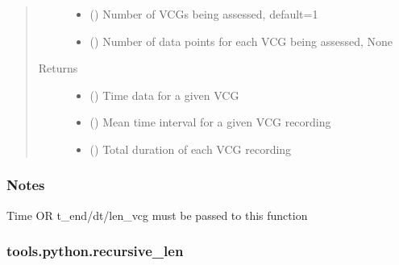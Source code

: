 \documentclass[letterpaper,10pt,english]{sphinxmanual}
\begin{document}
\begin{fulllineitems}
\begin{quote}
\begin{description}
\begin{itemize}
\item {} 
\sphinxAtStartPar
{} (\sphinxstyleliteralemphasis{\sphinxupquote{, }}) \textendash{} Number of VCGs being assessed, default=1

\item {} 
\sphinxAtStartPar
{} (\sphinxstyleliteralemphasis{\sphinxupquote{, }}) \textendash{} Number of data points for each VCG being assessed, None

\end{itemize}

\item[{Returns}] \leavevmode
\sphinxAtStartPar
\begin{itemize}
\item {} 
\sphinxAtStartPar
{} () \textendash{} Time data for a given VCG

\item {} 
\sphinxAtStartPar
{} () \textendash{} Mean time interval for a given VCG recording

\item {} 
\sphinxAtStartPar
{} () \textendash{} Total duration of each VCG recording

\end{itemize}


\end{description}\end{quote}
\subsubsection*{Notes}

\sphinxAtStartPar
Time OR t\_end/dt/len\_vcg must be passed to this function

\end{fulllineitems}



\subsubsection{tools.python.recursive\_len}
\label{\detokenize{_autosummary/tools.python.recursive_len:tools-python-recursive-len}}\label{\detokenize{_autosummary/tools.python.recursive_len::doc}}
\end{document}
